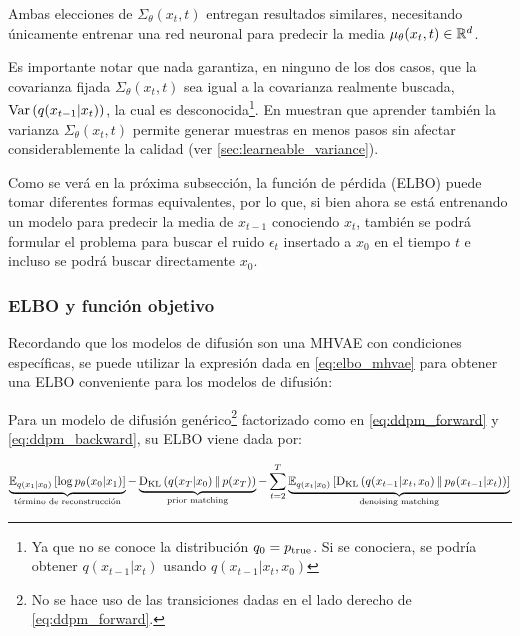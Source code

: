 Ambas elecciones de $\Sigma_\theta(x_t,t)$ entregan resultados similares, necesitando únicamente entrenar una red neuronal para predecir la media $\mu_\theta(x_t,t)\in\mathbb{R}^d$.

Es importante notar que nada garantiza, en ninguno de los dos casos, que la covarianza fijada $\Sigma_\theta(x_t,t)$ sea igual a la covarianza realmente buscada, $\operatorname{Var}\left(q(x_{t-1}|x_t)\right)$, la cual es desconocida\footnote{Ya que no se conoce la distribución $q_0=p_{\operatorname{true}}$. Si se conociera, se podría obtener $q(x_{t-1}|x_t)$ usando $q(x_{t-1}|x_t,x_0)$}. En \cite{nichol2021improved} muestran que aprender también la varianza $\Sigma_\theta(x_t,t)$ permite generar muestras en menos pasos sin afectar considerablemente la calidad (ver \autoref{sec:learneable_variance}).

Como se verá en la próxima subsección, la función de pérdida (ELBO) puede tomar diferentes formas equivalentes, por lo que, si bien ahora se está entrenando un modelo para predecir la media de $x_{t-1}$ conociendo $x_t$, también se podrá formular el problema para buscar el ruido $\epsilon_t$ insertado a $x_0$ en el tiempo $t$ e incluso se podrá buscar directamente $x_0$.

\subsubsection{ELBO y función objetivo}

Recordando que los modelos de difusión son una MHVAE con condiciones específicas, se puede utilizar la expresión dada en \eqref{eq:elbo_mhvae} para obtener una ELBO conveniente para los modelos de difusión:

\begin{teo}
    \label{teo:elbo_ddpm}
    Para un modelo de difusión genérico\footnote{No se hace uso de las transiciones dadas en el lado derecho de \eqref{eq:ddpm_forward}.} factorizado como en \eqref{eq:ddpm_forward} y \eqref{eq:ddpm_backward}, su ELBO viene dada por:

    \begin{equation}
        \label{eq:elbo_ddpm}
        \underbrace{\mathbb{E}_{q(x_1|x_0)}\left[\log p_\theta(x_0|x_1)\right]}_{\text{término de reconstrucción}} - \underbrace{\operatorname{D_{KL}}\left(q(x_T|x_0)\,\|\,p(x_T)\right)}_{\text{prior matching}} - \sum_{t=2}^T \underbrace{\mathbb{E}_{q(x_t|x_0)}\left[\operatorname{D_{KL}}\left(q(x_{t-1}|x_t,x_0)\,\|\,p_\theta(x_{t-1}|x_t)\right)\right]}_{\text{denoising matching}}
    \end{equation}
\end{teo}

